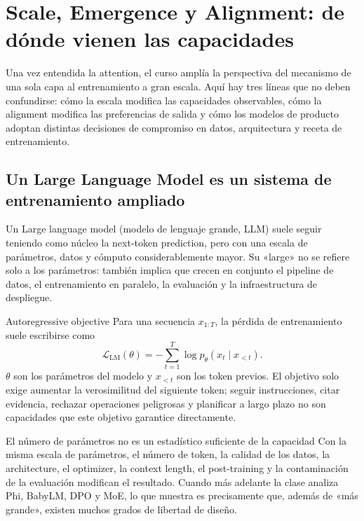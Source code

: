 \section{Scale, Emergence y Alignment: de dónde vienen las capacidades}

Una vez entendida la attention, el curso amplía la perspectiva del mecanismo de una sola capa al entrenamiento a gran escala. Aquí hay tres líneas que no deben confundirse: cómo la escala modifica las capacidades observables, cómo la alignment modifica las preferencias de salida y cómo los modelos de producto adoptan distintas decisiones de compromiso en datos, arquitectura y receta de entrenamiento.

\subsection{Un Large Language Model es un sistema de entrenamiento ampliado}

Un Large language model (modelo de lenguaje grande, LLM) suele seguir teniendo como núcleo la next-token prediction, pero con una escala de parámetros, datos y cómputo considerablemente mayor. Su «large» no se refiere solo a los parámetros: también implica que crecen en conjunto el pipeline de datos, el entrenamiento en paralelo, la evaluación y la infraestructura de despliegue.


\begin{importantbox}{Autoregressive objective}
Para una secuencia $x_{1:T}$, la pérdida de entrenamiento suele escribirse como
\[
\mathcal{L}_{\mathrm{LM}}(\theta)=-\sum_{t=1}^{T}\log p_{\theta}(x_t\mid x_{<t}).
\]
$\theta$ son los parámetros del modelo y $x_{<t}$ son los token previos. El objetivo solo exige aumentar la verosimilitud del siguiente token; seguir instrucciones, citar evidencia, rechazar operaciones peligrosas y planificar a largo plazo no son capacidades que este objetivo garantice directamente.
\end{importantbox}

\begin{warningbox}{El número de parámetros no es un estadístico suficiente de la capacidad}
Con la misma escala de parámetros, el número de token, la calidad de los datos, la architecture, el optimizer, la context length, el post-training y la contaminación de la evaluación modifican el resultado. Cuando más adelante la clase analiza Phi, BabyLM, DPO y MoE, lo que muestra es precisamente que, además de «más grande», existen muchos grados de libertad de diseño.
\end{warningbox}

